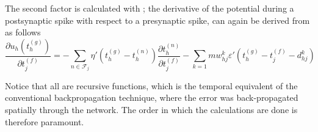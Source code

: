 The second factor is calculated with ; the derivative of the potential during a postsynaptic spike with respect to a presynaptic spike, can again be derived from  as follows
\begin{equation}
\frac{\partial u_{h}(t_{h}^{(g)})}{\partial t_{j}^{(f)}}
=
-\sum_{n\in \mathcal{F}_{j}}\eta'(t_{h}^{(g)}-t_{h}^{(n)})
\frac{\partial t_{h}^{(n)}}{\partial t_{j}^{(f)}}
-
\sum_{k=1}{m}w_{hj}^{k}\varepsilon'(t_{h}^{(g)}-t_{j}^{(f)}-d_{hj}^k)
\end{equation}

Notice that all are recursive functions, 
which is the temporal equivalent of the conventional backpropagation technique,
where the error was back-propagated spatially through the network. The order in which the calculations are done is therefore paramount.

